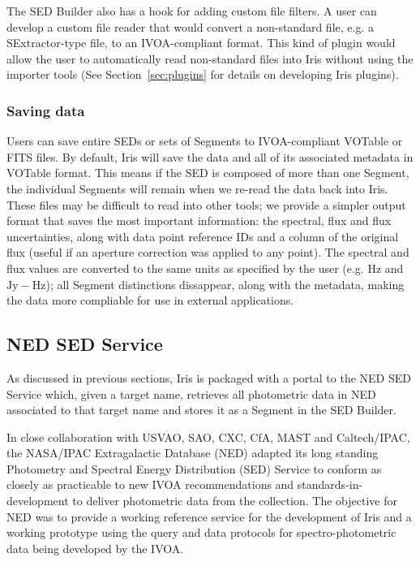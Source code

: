 \documentclass[5p]{elsarticle}
\begin{document}
The SED Builder also has a hook for adding custom file filters. A user can develop a custom file reader that would convert a non-standard file, e.g. a SExtractor-type file, to an IVOA-compliant format. This kind of plugin would allow the user to automatically read non-standard files into Iris without using the importer tools (See Section~\ref{sec:plugins} for details on developing Iris plugins).

\subsubsection{Saving data}
Users can save entire SEDs or sets of Segments to IVOA-compliant VOTable or FITS files. By default, Iris will save the data and all of its associated metadata in VOTable format. This means if the SED is composed of more than one Segment, the individual Segments will remain when we re-read the data back into Iris. These files may be difficult to read into other tools; we provide a simpler output format that saves the most important information: the spectral, flux and flux uncertainties, along with data point reference IDs and a column of the original flux (useful if an aperture correction was applied to any point). The spectral and flux values are converted to the same units as specified by the user (e.g. $\mathrm{Hz}$ and $\mathrm{Jy-Hz}$); all Segment distinctions dissappear, along with the metadata, making the data more compliable for use in external applications.

\subsection{NED SED Service}
\label{subsec:ned}

As discussed in previous sections, Iris is packaged with a portal to the NED SED Service which, given a target name, retrieves all photometric data in NED associated to that target name and stores it as a Segment in the SED Builder.

In close collaboration with USVAO, SAO, CXC, CfA, MAST and Caltech/IPAC, the NASA/IPAC Extragalactic Database (NED) adapted its long standing Photometry and Spectral Energy Distribution (SED) Service to conform as closely as practicable to new IVOA recommendations and
standards-in-development to deliver photometric data from the collection. The objective for NED was to provide a working reference service for the development of Iris and a working prototype using the query and data protocols for spectro-photometric data being developed by the IVOA.
\end{document}
